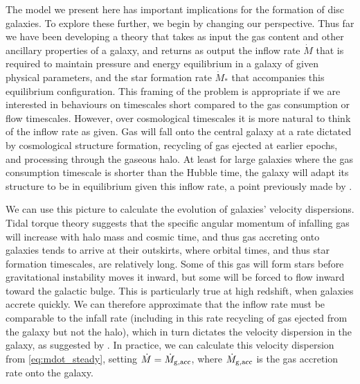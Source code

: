 \documentclass[useAMS,usenatbib]{mn2e}
\begin{document}
The model we present here has important implications for the formation of disc galaxies. To explore these further, we begin by changing our perspective. Thus far we have been developing a theory that takes as input the gas content and other ancillary properties of a galaxy, and returns as output the 
inflow rate $\dot{M}$ that is required to maintain pressure and energy equilibrium in a galaxy of given physical parameters, and the star formation rate $\dot{M}_*$ that accompanies this equilibrium configuration. This framing of the problem is appropriate if we are interested in behaviours on timescales short compared to the gas consumption or flow timescales. However, over cosmological timescales it is more natural to think of the inflow rate as given. Gas will fall onto the central galaxy at a rate dictated by cosmological structure formation, recycling of gas ejected at earlier epochs, and processing through the gaseous halo. At least for large galaxies where the gas consumption timescale is shorter than the Hubble time, the galaxy will adapt its structure to be in equilibrium given this inflow rate, a point previously made by \citet{dekel09a}.

We can use this picture to calculate the evolution of galaxies' velocity dispersions. Tidal torque theory suggests that the specific angular momentum of infalling gas will increase with halo mass and cosmic time, and thus gas accreting onto galaxies tends to arrive at their outskirts, where orbital times, and thus star formation timescales, are relatively long. Some of this gas will form stars before gravitational instability moves it inward, but some will be forced to flow inward toward the galactic bulge. This is particularly true at high redshift, when galaxies accrete quickly. We can therefore approximate that the inflow rate must be comparable to the infall rate (including in this rate recycling of gas ejected from the galaxy but not the halo), which in turn dictates the velocity dispersion in the galaxy, as suggested by \citet{genel12b}. In practice, we can calculate this velocity dispersion from \autoref{eq:mdot_steady}, setting $\dot{M} = \dot{M}_{\rm g,acc}$, where $\dot{M}_{\rm g,acc}$ is the gas accretion rate onto the galaxy.
\end{document}

